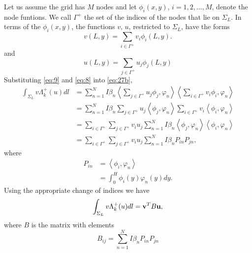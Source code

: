 \documentclass[11pt]{article}
\begin{document}
Let us assume the grid has $M$ nodes and let $\phi_i(x,y)$, $i=1,2, \ldots, M$, denote the node funtions. We call $\Gamma^+$ the set of the indices of the nodes that lie on $\Sigma_L$. In terms of the $\phi_i(x,y)$, the functions $v$, $u$, restricted to $\Sigma_L$, have the forms
\begin{equation}
  \label{eq:9}
  v(L,y) = \sum_{i \in \Gamma^+} v_i\phi_i(L,y).
\end{equation}
and
\begin{equation}
  \label{eq:8}
  u(L,y) = \sum_{j \in \Gamma^+} u_j\phi_j(L,y)
\end{equation}
Substituting \eqref{eq:9} and \eqref{eq:8} into \eqref{eq:27b},
\begin{align}
  \int_{\Sigma_L}v \Lambda_k^+(u) dl &= \sum_{n=1}^N I \beta_n \left\langle \sum_{j \in \Gamma^+} u_j\phi_j, \varphi_n \right\rangle
                                       \left\langle \sum_{i \in \Gamma^+} v_i\phi_i, \varphi_n \right\rangle \\
  &= \sum_{n=1}^N I \beta_n \sum_{j \in \Gamma^+} u_j\left\langle \phi_j, \varphi_n \right\rangle
    \sum_{i \in \Gamma^+} v_i \left\langle \phi_i, \varphi_n \right\rangle \\
&=  \sum_{i \in \Gamma^+} \sum_{j \in \Gamma^+} v_iu_j \sum_{n=1}^N I \beta_n \left\langle \phi_j, \varphi_n \right\rangle
  \left\langle \phi_i, \varphi_n \right\rangle \\
&=  \sum_{i \in \Gamma^+} \sum_{j \in \Gamma^+} v_iu_j \sum_{n=1}^N I \beta_n P_{in} P_{jn},
\end{align}
where
\begin{align}
  P_{in} &= \left\langle \phi_i, \varphi_n \right\rangle \\
           &= \int_0^H \phi_i(y) \varphi_n(y) dy.
\end{align}
Using the appropriate change of indices we have
\begin{equation}
  \label{eq:29}
   \int_{\Sigma_L}v \Lambda_k^+(u) dl = {\bf v}^T B {\bf u},
 \end{equation}
 where $B$ is the matrix with elements
 \begin{equation}
   \label{eq:30}
    B_{ij} = \sum_{n=1}^N I \beta_n P_{in} P_{jn}
 \end{equation}
\end{document}
